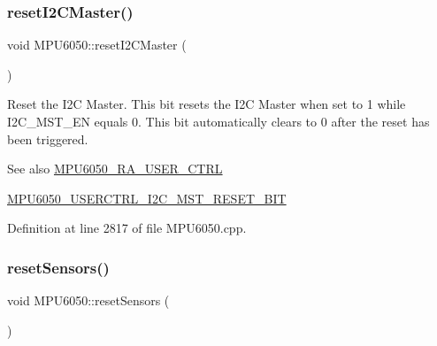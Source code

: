 \subsubsection{\texorpdfstring{resetI2CMaster()}{resetI2CMaster()}}
{\footnotesize\ttfamily void M\+P\+U6050\+::reset\+I2\+C\+Master (\begin{DoxyParamCaption}{ }\end{DoxyParamCaption})}

Reset the I2C Master. This bit resets the I2C Master when set to 1 while I2\+C\+\_\+\+M\+S\+T\+\_\+\+EN equals 0. This bit automatically clears to 0 after the reset has been triggered. \begin{DoxySeeAlso}{See also}
\mbox{\hyperlink{MPU6050_8h_acd4c638a6f677a42ecb9a3d7612d087a}{M\+P\+U6050\+\_\+\+R\+A\+\_\+\+U\+S\+E\+R\+\_\+\+C\+T\+RL}} 

\mbox{\hyperlink{MPU6050_8h_abca1324e14bfff124823daecc1df2479}{M\+P\+U6050\+\_\+\+U\+S\+E\+R\+C\+T\+R\+L\+\_\+\+I2\+C\+\_\+\+M\+S\+T\+\_\+\+R\+E\+S\+E\+T\+\_\+\+B\+IT}} 
\end{DoxySeeAlso}


Definition at line 2817 of file M\+P\+U6050.\+cpp.


\begin{DoxyCode}{0}

\end{DoxyCode}
\mbox{\label{classMPU6050_a9a271104d3302abc4af005c69a930094}} 
\subsubsection{\texorpdfstring{resetSensors()}{resetSensors()}}
{\footnotesize\ttfamily void M\+P\+U6050\+::reset\+Sensors (\begin{DoxyParamCaption}{ }\end{DoxyParamCaption})}


